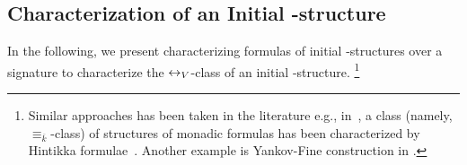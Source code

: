 \documentclass{article}
\begin{document}

\subsection{Characterization of an Initial \MPK-structure}

In the following, we present characterizing formulas of initial \MPK-structures  over a signature to characterize the $\leftrightarrow_V$-class of an initial \MPK-structure.
\footnote{Similar approaches has been taken in the literature e.g., in~\cite{DBLP:conf/birthday/1997ehrenfeucht},  a class (namely, $\equiv_{\overline{k}}$-class) of structures of monadic formulas has been characterized by Hintikka formulae~\cite{hintikka1953distributive}. Another example is Yankov-Fine construction in \cite{yankov1968three}.}
\end{document}

